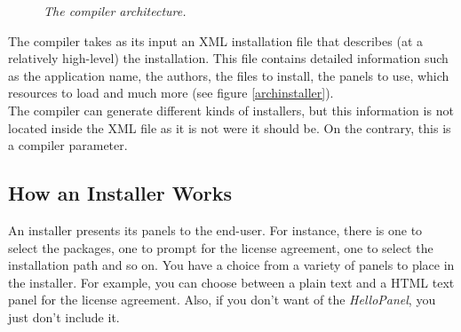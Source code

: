 \begin{figure}[h]
\caption{\label{comparch}
         \textit{The compiler architecture.}}
\begin{center}
\end{center}
\end{figure}

The compiler takes as its input an XML installation file that describes
(at a relatively high-level) the installation. This file contains
detailed information such as the application name, the authors, the
files to install, the panels to use, which resources to load and much
more (see figure \ref{archinstaller}).\\

The compiler can generate different kinds of installers, but this information is
not located inside the XML file as it is not were it should be. On the contrary,
this is a compiler parameter.\\

\subsection{How an Installer Works}

An installer presents its panels to the end-user. For instance, there is
one to select the packages, one to prompt for the license agreement, one
to select the installation path and so on. You have a choice from a
variety of panels to place in the installer. For example, you can choose
between a plain text and a HTML text panel for the license agreement.
Also, if you don't want of the \textit{HelloPanel}, you just don't
include it.\\ 

